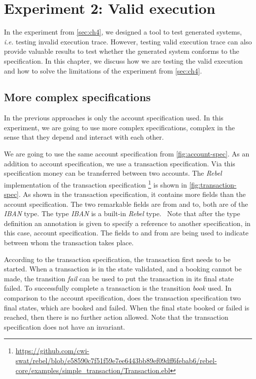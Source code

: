 \chapter{Experiment 2: Valid execution}\label{sec:ch5}

In the experiment from \autoref{sec:ch4}, we designed a tool to test generated
systems, \textit{i.e.} testing invalid execution trace. However, testing valid
execution trace can also provide valuable results to test whether the generated
system conforms to the specification. In this chapter, we discuss how we are
testing the valid execution and how to solve the limitations of the
experiment from \autoref{sec:ch4}.

\section{More complex specifications}\label{sec:ch5-complex-spec}
In the previous approaches is only the account specification used. In this
experiment, we are going to use more complex specifications, complex in the
sense that they depend and interact with each other.

We are going to use the
same account specification from \autoref{fig:account-spec}. As an addition to
account specification, we use a transaction specification. Via this
specification money can be transferred between two accounts.
The \textit{Rebel} implementation of the transaction specification \footnote{\url{https://github.com/cwi-swat/rebel/blob/e58590c7f51f59e7ee6443bb89ef09dff6febab6/rebel-core/examples/simple_transaction/Transaction.ebl}} is shown in \autoref{fig:transaction-spec}.
As shown in the transaction specification, it contains more fields than the
account specification. The two remarkable fields are from and to, both are of
the \textit{IBAN} type. The type \textit{IBAN} is a built-in \textit{Rebel}
type.~\cite[p.~3]{stoel_storm_vinju_bosman_2016} Note that after the type
definition an annotation is given to specify a reference to another
specification, in this case, account specification. The fields to and from are
being used to indicate between whom the transaction takes place.

According to the transaction specification, the transaction first
needs to be started. When a transaction is in the state validated, and a booking
cannot be made, the transition \textit{fail} can be used to put the transaction in its
final state failed. To successfully complete a transaction is the transition
\textit{book} used. In comparison to the account specification, does the transaction
specification two final states, which are booked and failed. When the final
state booked or failed is reached, then there is no further action allowed.
Note that the transaction specification does not have an invariant.

